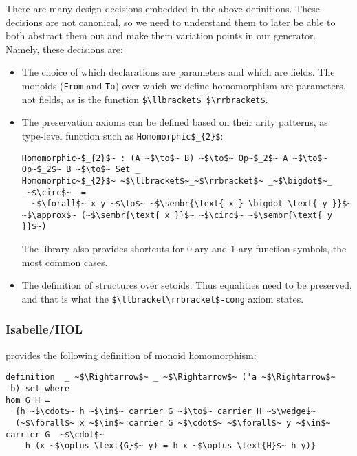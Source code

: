 There are many design decisions embedded in the above definitions. These
decisions are not canonical, so we need to understand them to later
be able to both abstract them out and make them variation points in our
generator. Namely, these decisions are:
\begin{itemize}
    \item The choice of which declarations are parameters and which are fields.
    The monoids (\verb|From| and \verb|To|) over which we define homomorphism
    are parameters, not fields, as is the function
    \lstinline[mathescape]|$\llbracket$_$\rrbracket$|.
    \item The preservation axioms can be defined based on their arity
    patterns, as type-level function such as
    \lstinline[mathescape]|Homomorphic$_{2}$|:
    \begin{verbatim}
Homomorphic~$_{2}$~ : (A ~$\to$~ B) ~$\to$~ Op~$_2$~ A ~$\to$~ Op~$_2$~ B ~$\to$~ Set _ 
Homomorphic~$_{2}$~ ~$\llbracket$~_~$\rrbracket$~ _~$\bigdot$~_ _~$\circ$~_ =
  ~$\forall$~ x y ~$\to$~ ~$\sembr{\text{ x } \bigdot \text{ y }}$~ ~$\approx$~ (~$\sembr{\text{ x }}$~ ~$\circ$~ ~$\sembr{\text{ y }}$~)
    \end{verbatim}
    The library also provides shortcuts for $0$-ary and $1$-ary function
    symbols, the most common cases.
    \item The definition of structures over setoids. Thus equalities need 
    to be preserved, and that is what the 
    \lstinline[mathescape]|$\llbracket\rrbracket$-cong| axiom states.
\end{itemize}

\subsubsection{Isabelle/HOL}
provides the following definition of \href{https://isabelle.in.tum.de/website-Isabelle2019/dist/library/HOL/HOL-Algebra/Group.html}{monoid homomorphism}:

\begin{verbatim}
definition  _ ~$\Rightarrow$~ _ ~$\Rightarrow$~ ('a ~$\Rightarrow$~ 'b) set where 
hom G H =
  {h ~$\cdot$~ h ~$\in$~ carrier G ~$\to$~ carrier H ~$\wedge$~ 
  (~$\forall$~ x ~$\in$~ carrier G ~$\cdot$~ ~$\forall$~ y ~$\in$~ carrier G  ~$\cdot$~ 
    h (x ~$\oplus_\text{G}$~ y) = h x ~$\oplus_\text{H}$~ h y)}
\end{verbatim}

